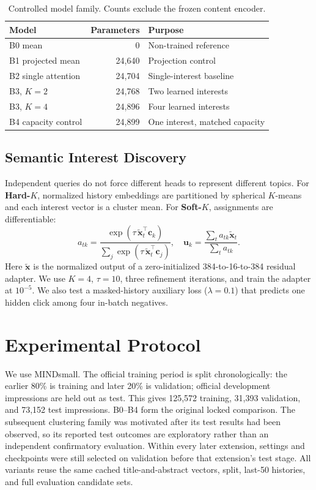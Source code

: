 \begin{table}[t]
\centering
\caption{Controlled model family. Counts exclude the frozen content encoder.}
\label{tab:models}
\small
\begin{tabular}{lrl}
\toprule
Model & Parameters & Purpose\\
\midrule
B0 mean & 0 & Non-trained reference\\
B1 projected mean & 24,640 & Projection control\\
B2 single attention & 24,704 & Single-interest baseline\\
B3, $K=2$ & 24,768 & Two learned interests\\
B3, $K=4$ & 24,896 & Four learned interests\\
B4 capacity control & 24,899 & One interest, matched capacity\\
\bottomrule
\end{tabular}
\end{table}

\subsection{Semantic Interest Discovery}
Independent queries do not force different heads to represent different topics. For \textbf{Hard-$K$}, normalized history embeddings are partitioned by spherical $K$-means and each interest vector is a cluster mean. For \textbf{Soft-$K$}, assignments are differentiable:
\begin{equation}
a_{tk}=\frac{\exp(\tau\,\widetilde{\mathbf{x}}_t^\top\mathbf{c}_k)}
{\sum_j\exp(\tau\,\widetilde{\mathbf{x}}_t^\top\mathbf{c}_j)},\quad
\mathbf{u}_k=\frac{\sum_t a_{tk}\widetilde{\mathbf{x}}_t}{\sum_t a_{tk}} .
\end{equation}
Here $\widetilde{\mathbf{x}}$ is the normalized output of a zero-initialized 384-to-16-to-384 residual adapter. We use $K=4$, $\tau=10$, three refinement iterations, and train the adapter at $10^{-5}$. We also test a masked-history auxiliary loss ($\lambda=0.1$) that predicts one hidden click among four in-batch negatives.

\section{Experimental Protocol}
We use MINDsmall. The official training period is split chronologically: the earlier 80\% is training and later 20\% is validation; official development impressions are held out as test. This gives 125,572 training, 31,393 validation, and 73,152 test impressions. B0--B4 form the original locked comparison. The subsequent clustering family was motivated after its test results had been observed, so its reported test outcomes are exploratory rather than an independent confirmatory evaluation. Within every later extension, settings and checkpoints were still selected on validation before that extension's test stage. All variants reuse the same cached title-and-abstract vectors, split, last-50 histories, and full evaluation candidate sets.


